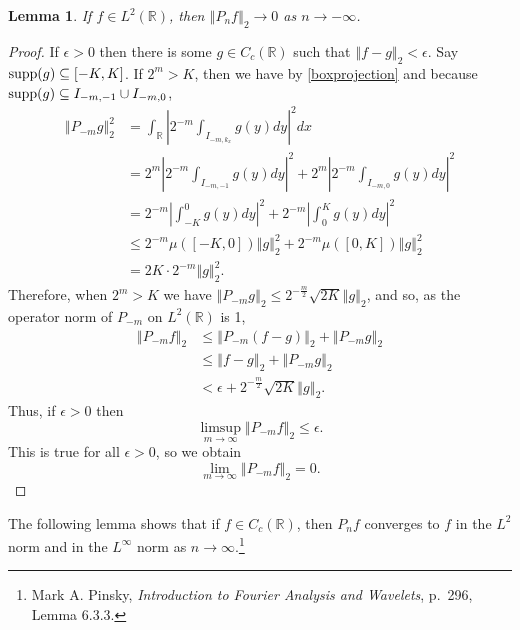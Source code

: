 \documentclass{article}
\newcommand{\supp}{\ensuremath\mathrm{supp}}
\newcommand{\norm}[1]{\left\Vert #1 \right\Vert}
\newtheorem{lemma}[theorem]{Lemma}
\theoremstyle{definition}
\begin{document}
\begin{lemma}
If $f \in L^2(\mathbb{R})$, then $\norm{P_n f}_2 \to 0$ as $n \to -\infty$.
\label{negativelimit}
\end{lemma}
\begin{proof}
If $\epsilon>0$ then there is some $g \in C_c(\mathbb{R})$ such that $\norm{f-g}_2<\epsilon$. Say $\supp(g) \subseteq [-K,K]$. If $2^m > K$, then
we have by \eqref{boxprojection} and because $\supp(g) \subseteq I_{-m,-1} \cup I_{-m,0}$,
\begin{align*}
\norm{P_{-m}g}_2^2&=\int_{\mathbb{R}} \left| 2^{-m} \int_{I_{-m,k_x}} g(y) dy \right|^2 dx\\
&=2^m \left|2^{-m} \int_{I_{-m,-1}} g(y) dy \right|^2+2^m\left|2^{-m} \int_{I_{-m,0}} g(y) dy \right|^2\\
&=2^{-m} \left| \int_{-K}^0 g(y) dy \right|^2+2^{-m} \left| \int_0^K g(y) dy \right|^2\\
&\leq 2^{-m} \mu([-K,0]) \norm{g}_2^2 +2^{-m} \mu([0,K]) \norm{g}_2^2 \\
&=2K \cdot 2^{-m} \norm{g}_2^2.
\end{align*}
Therefore,  when $2^m > K$ we have $\norm{P_{-m}g}_2 \leq 2^{-\frac{m}{2}} \sqrt{2K} \norm{g}_2$, and so, as the operator norm of $P_{-m}$ on $L^2(\mathbb{R})$ is 1,
\begin{align*}
\norm{P_{-m}f}_2& \leq \norm{P_{-m}(f-g)}_2 + \norm{P_{-m}g}_2\\
& \leq \norm{f-g}_2 + \norm{P_{-m}g}_2\\
& < \epsilon+  2^{-\frac{m}{2}} \sqrt{2K} \norm{g}_2.
\end{align*}
Thus, if $\epsilon>0$ then
\[
\limsup_{m \to \infty} \norm{P_{-m} f}_2 \leq \epsilon.
\]
This is true for all $\epsilon>0$, so we obtain
\[
\lim_{m \to \infty} \norm{P_{-m}f}_2 = 0.
\]
\end{proof}



The following lemma shows that if $f \in C_c(\mathbb{R})$, then $P_nf$ converges to $f$ in
the $L^2$ norm and in the $L^\infty$ norm as $n \to \infty$.\footnote{Mark A. Pinsky, {\em Introduction to Fourier Analysis and Wavelets}, p.~296, Lemma 6.3.3.}
\end{document}
